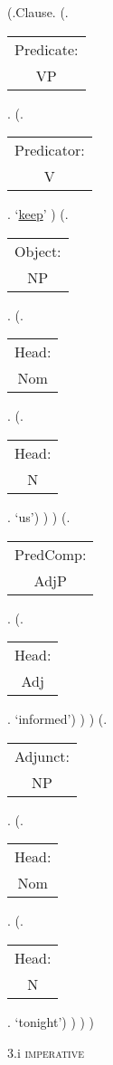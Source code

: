 \documentclass[12pt,letterpaper]{article}
\begin{document}
\begin{figure}
	\begin{center}
		\begin{parsetree}
			(.Clause.
			(.\begin{tabular}{c}Predicate:\\VP\end{tabular}.
			(.\begin{tabular}{c}Predicator:\\V\end{tabular}.    `\underline{keep}' )
			(.\begin{tabular}{c}Object:\\NP\end{tabular}.  
			(.\begin{tabular}{c}Head:\\Nom\end{tabular}.
			(.\begin{tabular}{c}Head:\\N\end{tabular}. `us')
			)
			)
			(.\begin{tabular}{c}PredComp:\\AdjP\end{tabular}.  
			(.\begin{tabular}{c}Head:\\Adj\end{tabular}. `informed')
			)
			)
			(.\begin{tabular}{c}Adjunct:\\NP\end{tabular}.  
			(.\begin{tabular}{c}Head:\\Nom\end{tabular}.
			(.\begin{tabular}{c}Head:\\N\end{tabular}. `tonight')
			)
			)
			)
			
		
			
		\end{parsetree}
		\hfill \break \hfill \break
		3.i \textsc{imperative} 
	\end{center}
\end{figure}
\end{document}

